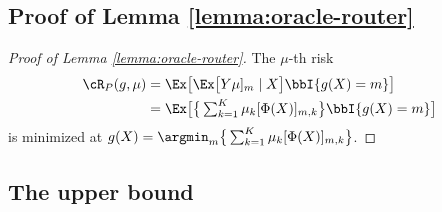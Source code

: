 \subsection{Proof of Lemma \ref{lemma:oracle-router}}
\begin{proof}[Proof of Lemma \ref{lemma:oracle-router}]
    The $\mu$-th risk 
    \[
    \begin{aligned}
        \textstyle \cR_P(g, \mu) & \textstyle = \Ex\big [\Ex\big[Y\mu]_m\mid X\big] \bbI\{g(X) = m\} \big]\\
        & \textstyle =\Ex\big [\big\{ \sum_{k = 1}^K \mu_k [\Phi (X)]_{m, k} \big\}\bbI\{g(X) = m\} \big]
    \end{aligned}
    \] is minimized at $g(X) = \argmin_m \big\{ \sum_{k = 1}^K \mu_k [\Phi (X)]_{m, k} \big\}$.
\end{proof}




\subsection{The upper bound}


